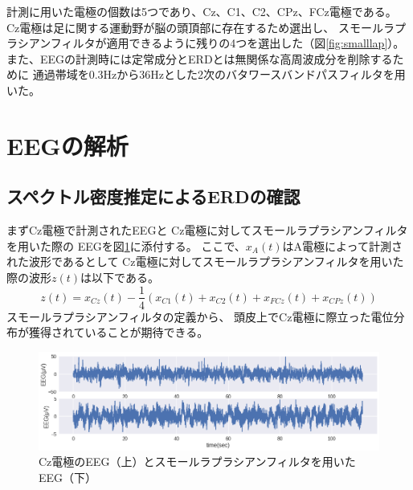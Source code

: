 計測に用いた電極の個数は5つであり、Cz、C1、C2、CPz、FCz電極である。
Cz電極は足に関する運動野が脳の頭頂部に存在するため選出し、
スモールラプラシアンフィルタが適用できるように残りの4つを選出した（図\ref{fig:smalllap}）。
また、EEGの計測時には定常成分とERDとは無関係な高周波成分を削除するために
通過帯域を0.3Hzから36Hzとした2次のバタワースバンドパスフィルタを用いた。

\section{EEGの解析}
\subsection{スペクトル密度推定によるERDの確認}
まずCz電極で計測されたEEGと
Cz電極に対してスモールラプラシアンフィルタを用いた際の
EEGを図\ref{fig:eegsub1}に添付する。
ここで、\(x_{A}(t)\)はA電極によって計測された波形であるとして
Cz電極に対してスモールラプラシアンフィルタを用いた際の波形\(z(t)\)は以下である。
\begin{equation}
    z(t) = x_{Cz}(t) - \frac{1}{4}(x_{C1}(t) + x_{C2}(t) + x_{FCz}(t) + x_{CPz}(t))
\end{equation}
スモールラプラシアンフィルタの定義から、
頭皮上でCz電極に際立った電位分布が獲得されていることが期待できる。

\begin{figure}
    \centering
    \includegraphics[width=13cm]{images/eeg_sub1.png}
    \caption{Cz電極のEEG（上）とスモールラプラシアンフィルタを用いたEEG（下）}
    \label{fig:eegsub1}
\end{figure}


